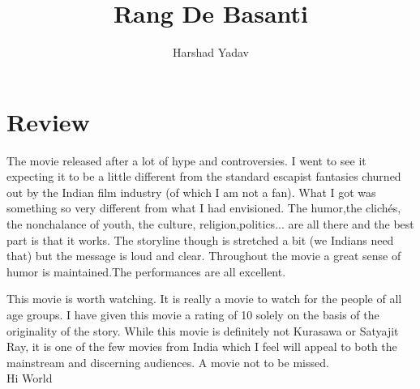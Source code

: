 \documentclass[a4paper,10pt]{article}
\title{Rang De Basanti}
\author{Harshad Yadav}
\begin{document}
\maketitle

\section{Review}
The movie released after a lot of hype and controversies. I went to see it expecting it to be a little different from the standard escapist fantasies churned out by the Indian film industry (of which I am not a fan). What I got was something so very different from what I had envisioned. The humor,the clichés, the nonchalance of youth, the culture, religion,politics... are all there and the best part is that it works. The storyline though is stretched a bit (we Indians need that) but the message is loud and clear. Throughout the movie a great sense of humor is maintained.The performances are all excellent.

This movie is worth watching. 
It is really a movie to watch for the people of all age groups. 
I have given this movie a rating of 10 solely on the basis of the originality of the story. While this movie is definitely not Kurasawa or Satyajit Ray, it is one of the few movies from India which I feel will appeal to both the mainstream and discerning audiences. A movie not to be missed. \\

Hi World
\end{document}

